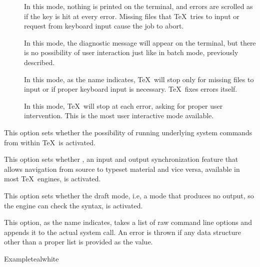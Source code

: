 \begin{description}
\begin{description}
\begin{description}
\item[] In this mode, nothing is printed on the terminal, and errors are scrolled as if the  key is hit at every error. Missing files that \TeX\ tries to input or request from keyboard input cause the job to abort.

\item[] In this mode, the diagnostic message will appear on the terminal, but there is no possibility of user interaction just like in batch mode, previously described.

\item[] In this mode, as the name indicates, \TeX\ will stop only for missing files to input or if proper keyboard input is necessary. \TeX\ fixes errors itself.

\item[] In this mode, \TeX\ will stop at each error, asking for proper user intervention. This is the most user interactive mode available.
\end{description}

\item[\rpsbox{shell}] This option sets whether the possibility of running underlying system commands from within \TeX\ is activated.

\item[\rpsbox{synctex}] This option sets whether , an input and output synchronization feature that allows navigation from source to typeset material and vice versa, available in most \TeX\ engines, is activated.

\item[\rpsbox{draft}] This option sets whether the draft mode, i.e, a mode that produces no output, so the engine can check the syntax, is activated.

\item[\abox{options}] This option, as the name indicates, takes a list of raw command line options and appends it to the actual system call. An error is thrown if any data structure other than a proper list is provided as the value.
\end{description}

\begin{codebox}{Example}{teal}{\icnote}{white}
\end{codebox}


\end{description}
